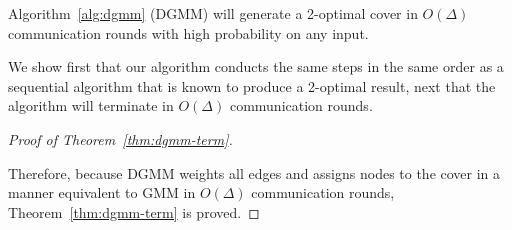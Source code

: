\begin{thm}
  Algorithm~\ref{alg:dgmm} (DGMM) will generate a 2-optimal cover in $O(\Delta)$ communication rounds with high probability on any input.
\label{thm:dgmm-term}
\end{thm}
\begin{smy}
We show first that our algorithm conducts the same steps in the same order as a sequential algorithm that is known to produce a 2-optimal result, next that the algorithm will terminate in $O(\Delta)$ communication rounds.
\end{smy} 


\begin{proof}[Proof of Theorem~\ref{thm:dgmm-term}]
\label{prf:correct}




Therefore, because DGMM weights all edges and assigns nodes to the cover in a manner equivalent to GMM in $O(\Delta)$ communication rounds, Theorem~\ref{thm:dgmm-term} is proved.
\end{proof}
